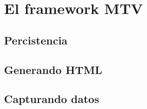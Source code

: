 \chapter{El framework MTV}

\section{Percistencia}

\section{Generando HTML}

\section{Capturando datos}